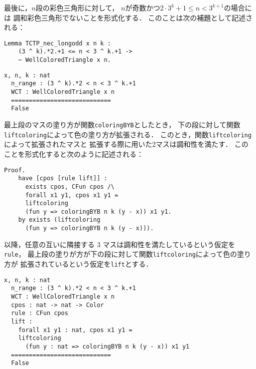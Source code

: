 最後に，$n$段の彩色三角形に対して，
$n$が奇数かつ$2 \cdot 3^{k} + 1 \leq n < 3^{k+1}$の場合には
調和彩色三角形でないことを形式化する．
このことは次の補題として記述される：
\begin{lstlisting}[language=Coq]
  Lemma TCTP_nec_longodd x n k :
    (3 ^ k).*2.+1 <= n < 3 ^ k.+1 ->
    ~ WellColoredTriangle x n.
\end{lstlisting}
\begin{lstlisting}[language=Coq]
  x, n, k : nat
  n_range : (3 ^ k).*2 < n < 3 ^ k.+1
  WCT : WellColoredTriangle x n
  ============================
  False
\end{lstlisting}
最上段のマスの塗り方が関数{\tt{coloringBYB}}としたとき，
下の段に対して関数{\tt{liftcoloring}}によって色の塗り方が拡張される．
このとき，関数{\tt{liftcoloring}}によって拡張されたマスと
拡張する際に用いた2マスは調和性を満たす．
このことを形式化すると次のように記述される：
\begin{lstlisting}[language=Coq]
  Proof.
    have [cpos [rule lift]] :
      exists cpos, CFun cpos /\
      forall x1 y1, cpos x1 y1 =
      liftcoloring
      (fun y => coloringBYB n k (y - x)) x1 y1.
    by exists (liftcoloring
      (fun y => coloringBYB n k (y - x))).
\end{lstlisting}
以降，任意の互いに隣接する 3 マスは調和性を満たしているという仮定を{\tt{rule}}，
最上段の塗りが方が下の段に対して関数{\tt{liftcoloring}}によって色の塗り方が
拡張されているという仮定を{\tt{lift}}とする．
\begin{lstlisting}[language=Coq]
  x, n, k : nat
  n_range : (3 ^ k).*2 < n < 3 ^ k.+1
  WCT : WellColoredTriangle x n
  cpos : nat -> nat -> Color
  rule : CFun cpos
  lift :
    forall x1 y1 : nat, cpos x1 y1 =
    liftcoloring
      (fun y : nat => coloringBYB n k (y - x)) x1 y1
  ============================
  False
\end{lstlisting}

